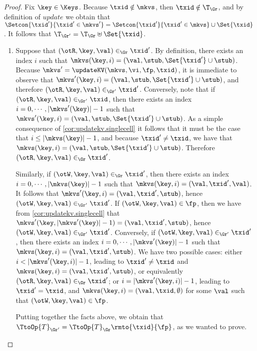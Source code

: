 \begin{proof}
Fix $\key \in \Keys$. Because $\txid \notin \mkvs$, then $\txid \notin \T_{\Gr}$, 
and by definition of $update$ we obtain that $\Setcon{\txid' }{ \txid' \in \mkvs'} = 
\Setcon{\txid' }{ \txid' \in \mkvs} \cup \Set{\txid}$. It follows that $\T_{\Gr'} = \T_{\Gr} \uplus \Set{\txid }$.

\begin{enumerate}
\item Suppose that $(\otR, \key, \val) \in_{\Gr} \txid'$. By definition, 
there exists an index $i$ such 
that $\mkvs(\key, i) = (\val, \stub, \Set{\txid'} \cup \stub)$. Because $\mkvs' = \updateKV(\mkvs, \vi, \fp, \txid)$, 
it is immediate to observe that $\mkvs'(\key, i) = (\val, \stub, \Set{\txid'} \cup \stub)$, and therefore 
$(\otR,\key, \val) \in_{\Gr'} \txid'$. Conversely, note that if $(\otR, \key, \val) \in_{\Gr'} \txid$, 
then there exists an index $i = 0,\cdots, \lvert \mkvs'(\key) \rvert - 1$ such that 
$\mkvs'(\key, i) = (\val, \stub, \Set{\txid'} \cup \stub)$. As a simple consequence of \cref{cor:updatekv.singlecell} 
it follows that it must be the case that $i \leq \lvert \mkvs(\key) \rvert - 1$, and because 
$\txid' \neq \txid$, we have that $\mkvs(\key, i) = (\val, \stub, \Set{\txid'} \cup \stub)$. Therefore 
$(\otR, \key, \val) \in_{\Gr} \txid'$. 

Similarly, if $(\otW, \key, \val) \in_{\Gr} \txid'$, 
then there exists an index $i=0,\cdots, \lvert \mkvs(\key) \rvert - 1$ such that 
$\mkvs(\key, i) = (\val, \txid', \val)$. It follows that $\mkvs'(\key, i) = (\val, \txid', \stub)$, hence 
$(\otW, \key, \val) \in_{\Gr'} \txid'$. If $(\otW, \key, \val) \in \fp$, then we 
have from \cref{cor:updatekv.singlecell} that $\mkvs'(\key, \lvert \mkvs'(\key) \rvert - 1) = (\val, \txid', \stub)$, 
hence $(\otW, \key, \val) \in_{\Gr'} \txid'$. 
Conversely, if $(\otW, \key, \val) \in_{\Gr'} \txid'$, then there exists an index 
$i = 0, \cdots, \lvert \mkvs'(\key) \rvert - 1$ such that $\mkvs(\key, i) = (\val, \txid', \stub)$. 
We have two possible cases: either $i < \lvert \mkvs'(\key, i) \rvert - 1$, leading to  
$\txid' \neq \txid$ and $\mkvs(\key, i) = (\val, \txid', \stub)$, or equivalently 
$(\otR,\key, \val) \in_{\Gr} \txid'$; or $i = \lvert \mkvs'(\key, i) \rvert - 1$, 
leading to $\txid' = \txid$, and $\mkvs(\key, i) = (\val, \txid, \emptyset)$ 
for some $\val$ such that $(\otW, \key, \val) \in \fp$. 

Putting together the facts above, we obtain that $\TtoOp{T}_{\Gr'} = 
\TtoOp{T}_{\Gr}\rmto{\txid}{\fp}$, as we wanted to prove.


\end{enumerate}
\end{proof}
